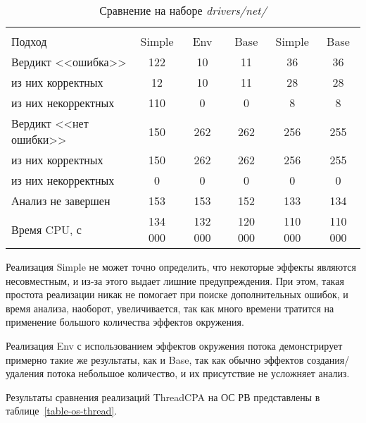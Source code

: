   \begin{table}[h]\footnotesize \centering
  	\label{table-drivers-thread}
    \caption{Сравнение  на наборе \textit{drivers/net/}}
    \begin{tabular}{ | l | c | c | c | c | c |}
      \hline
      					& \multicolumn{3}{c|}{\theoryraces} 			& \multicolumn{2}{c|}{\combatmode} 	\\
      Подход         				& Simple 	& Env 		& Base 		& Simple 	& Base  	\\ \hline
      Вердикт <<ошибка>> 				& 122    	& 10   		& 11   		& 36        & 36  	 	\\ 
  \hspace{0.5cm} из них корректных 	& 12 		& 10 		& 11   		& 28       	& 28   		\\ 
  \hspace{0.5cm} из них некорректных & 110 		& 0 		& 0   		& 8       	& 8     	\\ \hline
      Вердикт <<нет ошибки>>  		& 150      	& 262    	& 262    	& 256      	& 255     	\\ 
  \hspace{0.5cm} из них корректных 	& 150 		& 262    	& 262    	& 256       & 255   	\\
  \hspace{0.5cm} из них некорректных & 0 		& 0    		& 0     	& 0         & 0   		\\ \hline
      Анализ не завершен       		& 153     	& 153    	& 152    	& 133      	& 134   	\\ \hline
      Время CPU, с   				& 134 000 	& 132 000 	& 120 000 	& 110 000  	& 110 000   \\ 
      \hline
    \end{tabular}
  \end{table}

Реализация Simple не может точно определить, что некоторые эффекты являются несовместным, и из-за этого выдает лишние предупреждения.
При этом, такая простота реализации никак не помогает при поиске дополнительных ошибок, и время анализа, наоборот, увеличивается, так как много времени тратится на применение большого количества эффектов окружения.

Реализация Env с использованием эффектов окружения потока демонстрирует примерно такие же результаты, как и Base, так как обычно эффектов создания/удаления потока небольшое количество, и их присутствие не усложняет анализ.

Результаты сравнения реализаций ThreadCPA на ОС РВ представлены в таблице~\ref{table-os-thread}.

